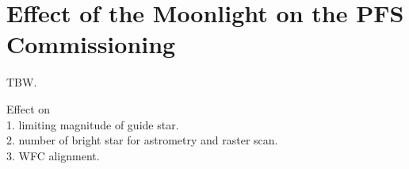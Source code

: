 \section{Effect of the Moonlight on the PFS Commissioning}
TBW.

Effect on \\
1.  limiting magnitude of guide star. \\
2. number of bright star for astrometry and raster scan. \\
3. WFC alignment.






